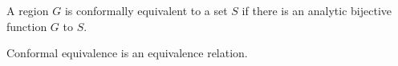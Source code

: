 \documentclass[12pt]{article}
\begin{document}
A region $G$ is conformally equivalent to a set $S$ if there is an analytic bijective function  $G$ to $S$. 

Conformal equivalence is an equivalence relation.
\end{document}
